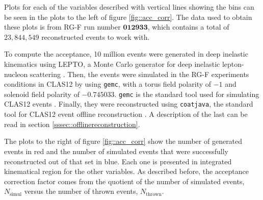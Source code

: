     Plots for each of the variables described with vertical lines showing the bins can be seen in the plots to the left of figure \ref{fig::acc_corr}.
    The data used to obtain these plots is from RG-F run number $\mathbf{012933}$, which contains a total of $23,844,549$ reconstructed events to work with.

    To compute the acceptance, 10 million events were generated in deep inelastic kinematics using LEPTO, a Monte Carlo generator for deep inelastic lepton-nucleon scattering \cite{ingelman1997}.
    Then, the events were simulated in the RG-F experiments conditions in CLAS12 by using \texttt{gemc}, with a torus field polarity of $-1$ and solenoid field polarity of $-0.745033$.
    \texttt{gemc} is the standard tool used for simulating CLAS12 events \cite{ungaro2020gemc}.
    Finally, they were reconstructed using \texttt{coatjava}, the standard tool for CLAS12 event offline reconstruction \cite{ziegler2020}.
    A description of the last can be read in section \ref{sssec::offlinereconstruction}.

    The plots to the right of figure \ref{fig::acc_corr} show the number of generated events in red and the number of simulated events that were successfully reconstructed out of that set in blue.
    Each one is presented in integrated kinematical region for the other variables.
    As described before, the acceptance correction factor comes from the quotient of the number of simulated events, $N_\text{simul}$ versus the number of thrown events, $N_\text{thrown}$.

